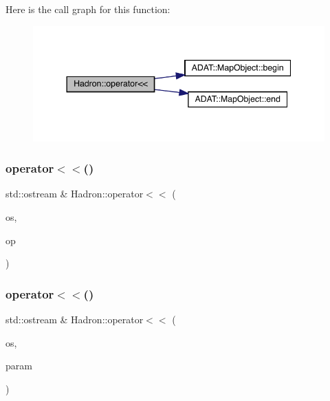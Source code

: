 Here is the call graph for this function\+:
\nopagebreak
\begin{figure}[H]
\begin{center}
\leavevmode
\includegraphics[width=344pt]{d1/daf/namespaceHadron_a800dbac093bd07f370068965de5868b3_cgraph}
\end{center}
\end{figure}
\mbox{\label{namespaceHadron_a7b979b64d9a0ab8025031a090f9494c0}} 
\subsubsection{\texorpdfstring{operator$<$$<$()}{operator<<()}\hspace{0.1cm}{\footnotesize\ttfamily [45/48]}}
{\footnotesize\ttfamily std\+::ostream \& Hadron\+::operator$<$$<$ (\begin{DoxyParamCaption}\item[{std\+::ostream \&}]{os,  }\item[{const \mbox{\hyperlink{structHadron_1_1SingleHadronQuarkFlavor__t}{Single\+Hadron\+Quark\+Flavor\+\_\+t}} \&}]{op }\end{DoxyParamCaption})}

\mbox{\label{namespaceHadron_a4ff4eac2687982e6a251bf3524940b01}} 
\subsubsection{\texorpdfstring{operator$<$$<$()}{operator<<()}\hspace{0.1cm}{\footnotesize\ttfamily [46/48]}}
{\footnotesize\ttfamily std\+::ostream \& Hadron\+::operator$<$$<$ (\begin{DoxyParamCaption}\item[{std\+::ostream \&}]{os,  }\item[{const \mbox{\hyperlink{classHadron_1_1HadronDistOperatorRep__t}{Hadron\+Dist\+Operator\+Rep\+\_\+t}} \&}]{param }\end{DoxyParamCaption})}



